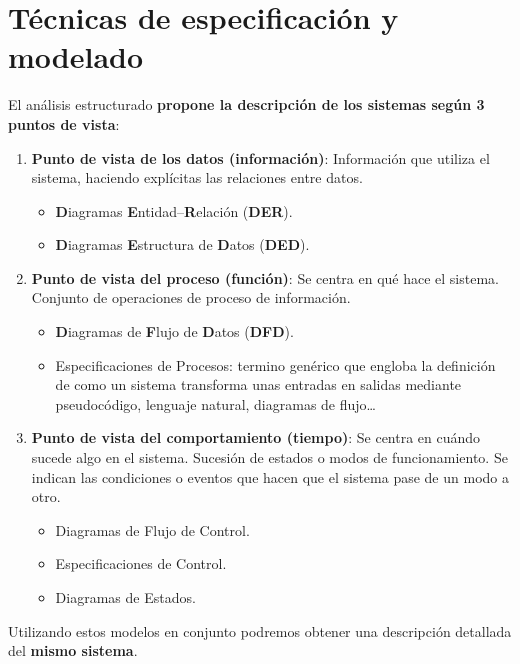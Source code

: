 \section{Técnicas de especificación y modelado}
El análisis estructurado \textbf{propone la descripción de los sistemas según 3 puntos de vista}:
\begin{enumerate}
    \item \textbf{Punto de vista de los datos (información)}: Información que utiliza el sistema, haciendo explícitas las relaciones entre datos.
          \begin{itemize}
              \item \textbf{D}iagramas \textbf{E}ntidad--\textbf{R}elación (\textbf{DER}).
              \item \textbf{D}iagramas \textbf{E}structura de \textbf{D}atos (\textbf{DED}).
          \end{itemize}
    \item \textbf{Punto de vista del proceso (función)}: Se centra en qué hace el sistema. Conjunto de operaciones de proceso de información.
          \begin{itemize}
              \item \textbf{D}iagramas de \textbf{F}lujo de \textbf{D}atos (\textbf{DFD}).
              \item Especificaciones de Procesos: termino genérico que engloba la definición de como un sistema transforma unas entradas en salidas mediante pseudocódigo, lenguaje natural, diagramas de flujo\ldots
          \end{itemize}
    \item \textbf{Punto de vista del comportamiento (tiempo)}: Se centra en cuándo sucede algo en el sistema. Sucesión de estados o modos de funcionamiento. Se indican las condiciones o eventos que hacen que el sistema pase de un modo a otro.
          \begin{itemize}
              \item Diagramas de Flujo de Control.
              \item Especificaciones de Control.
              \item Diagramas de Estados.
          \end{itemize}
\end{enumerate}

Utilizando estos modelos en conjunto podremos obtener una descripción detallada del \textbf{mismo sistema}.

